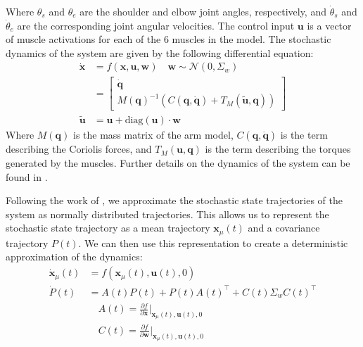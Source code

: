 \documentclass[letterpaper, 10pt, conference]{ieeeconf}
\begin{document}
Where $\theta_s$ and $\theta_e$ are the shoulder and elbow joint angles, respectively, and $\dot{\theta}_s$ and $\dot{\theta}_e$ are the corresponding joint angular velocities. The control input $\mathbf{u}$ is a vector of muscle activations for each of the 6 muscles in the model. The stochastic dynamics of the system are given by the following differential equation:
\begin{align}
    \dot{\mathbf{x}} &= f(\mathbf{x}, \mathbf{u}, \mathbf{w}) \quad \mathbf{w} \sim \mathcal{N}(0, \Sigma_w) \\
    &= \begin{bmatrix}
        \dot{\mathbf{q}} \\
        M(\mathbf{q})^{-1} \left(C(\mathbf{q}, \dot{\mathbf{q}}) + T_M(\tilde{\mathbf{u}}, \mathbf{q})\right)
    \end{bmatrix} \\
    \tilde{\mathbf{u}} &= \mathbf{u} + \text{diag}(\mathbf{u}) \cdot \mathbf{w}
\end{align}
Where $M(\mathbf{q})$ is the mass matrix of the arm model, $C(\mathbf{q}, \dot{\mathbf{q}})$ is the term describing the Coriolis forces, and $T_M(\mathbf{u}, \mathbf{q})$ is the term describing the torques generated by the muscles. Further details on the dynamics of the system can be found in \cite{c7}.

Following the work of \cite{c7}, we approximate the stochastic state trajectories of the system as normally distributed trajectories. This allows us to represent the stochastic state trajectory as a mean trajectory $\mathbf{x}_\mu(t)$ and a covariance trajectory $P(t)$. We can then use this representation to create a deterministic approximation of the dynamics: 
\begin{align*}
    \dot{\mathbf{x}}_\mu(t) &= f(\mathbf{x}_\mu(t), \mathbf{u}(t), 0) \\
    \dot{P}(t) &= A(t)P(t) + P(t)A(t)^\top + C(t) \Sigma_w C(t)^\top \\
    &\quad A(t) = \frac{\partial f}{\partial \mathbf{x}}\bigg|_{\mathbf{x}_\mu(t), \mathbf{u}(t), 0} \\
    &\quad C(t) = \frac{\partial f}{\partial \mathbf{w}}\bigg|_{\mathbf{x}_\mu(t), \mathbf{u}(t), 0}
\end{align*}
\end{document}

